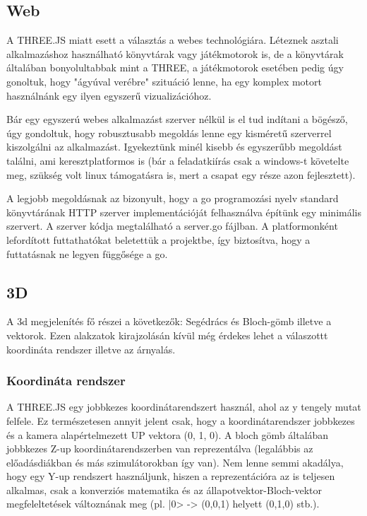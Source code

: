 \documentclass[12pt]{article}
\begin{document}
	
	\subsection{Web}
	A THREE.JS miatt esett a választás a webes technológiára. Léteznek asztali alkalmazáshoz használható könyvtárak vagy játékmotorok is, de a könyvtárak általában bonyolultabbak mint a THREE, a játékmotorok esetében pedig úgy gonoltuk, hogy "ágyúval verébre" szituáció lenne, ha egy komplex motort használnánk egy ilyen egyszerű vizualizációhoz.
	
	
	Bár egy egyszerú webes alkalmazást szerver nélkül is el tud indítani a bögésző, úgy gondoltuk, hogy robusztusabb megoldás lenne egy kisméretű szerverrel kiszolgálni az alkalmazást. Igyekeztünk minél kisebb és egyszerűbb megoldást találni, ami keresztplatformos is (bár a feladatkiírás csak a windows-t követelte meg, szükség volt linux támogatásra is, mert a csapat egy része azon fejlesztett).
	
	
	A legjobb megoldásnak az bizonyult, hogy a go programozási nyelv standard könyvtárának HTTP szerver implementációját felhasználva építünk egy minimális szervert. A szerver kódja megtalálható a server.go fájlban. A platformonként lefordított futtathatókat beletettük a projektbe, így biztosítva, hogy a futtatásnak ne legyen függősége a go.
	
	
	\subsection{3D}
	A 3d megjelenítés fő részei a következők: Segédrács és Bloch-gömb illetve a vektorok. Ezen alakzatok kirajzolásán kívül még érdekes lehet a válaszottt koordináta rendszer illetve az árnyalás.
	
	\subsubsection{Koordináta rendszer}
	A THREE.JS egy jobbkezes koordinátarendszert használ, ahol az y tengely mutat felfele. Ez természetesen annyit jelent csak, hogy a koordinátarendszer jobbkezes és a kamera alapértelmezett UP vektora (0, 1, 0). A bloch gömb általában jobbkezes Z-up koordinátarendszerben van reprezentálva (legalábbis az előadásdiákban és más szimulátorokban így van). Nem lenne semmi akadálya, hogy egy Y-up rendszert használjunk, hiszen a reprezentációra az is teljesen alkalmas, csak a konverziós matematika és az állapotvektor-Bloch-vektor megfeleltetések változnának meg (pl. |0> -> (0,0,1) helyett (0,1,0) stb.). 
	
\end{document}
